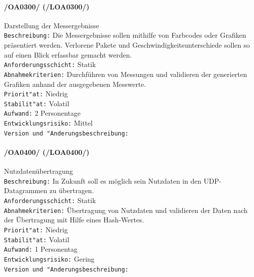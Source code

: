 \paragraph{/OA0300/ (/LOA0300/)} Darstellung der Messergebnisse\\
\texttt{Beschreibung:} Die Messergebnisse sollen mithilfe von Farbcodes oder
Grafiken präsentiert werden. Verlorene Pakete und Geschwindigkeitsunterschiede
sollen so auf einen Blick erfassbar gemacht werden.\\
\texttt{Anforderungsschicht:} Statik\\ 
\texttt{Abnahmekriterien:} Durchführen von Messungen und validieren der
generierten Grafiken anhand der ausgegebenen Messwerte.\\ 
\texttt{Priorit"at:} Niedrig\\
\texttt{Stabilit"at:} Volatil\\
\texttt{Aufwand:} 2 Personentage\\
\texttt{Entwicklungsrisiko:} Mittel\\
\texttt{Version und "Anderungsbeschreibung:}

\paragraph{/OA0400/ (/LOA0400/)} Nutzdatenübertragung\\
\texttt{Beschreibung:} In Zukunft soll es möglich sein Nutzdaten in den
UDP-Datagrammen zu übertragen.\\
\texttt{Anforderungsschicht:} Statik\\ 
\texttt{Abnahmekriterien:} Übertragung von Nutzdaten und validieren der Daten
nach der Übertragung mit Hilfe eines Hash-Wertes.\\
\texttt{Priorit"at:} Niedrig\\
\texttt{Stabilit"at:} Volatil\\
\texttt{Aufwand:} 1 Personentag\\
\texttt{Entwicklungsrisiko:} Gering\\
\texttt{Version und "Anderungsbeschreibung:}